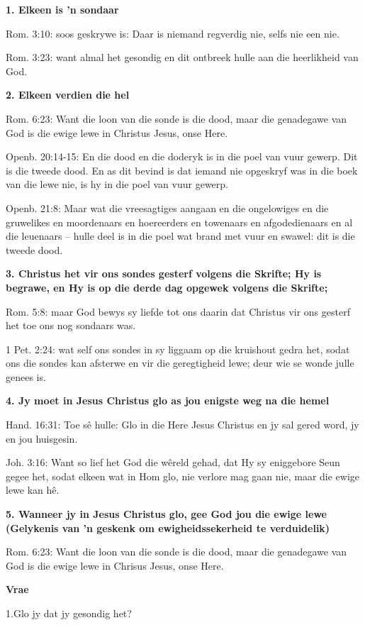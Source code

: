 \textbf{1. Elkeen is 'n sondaar}

Rom. 3:10: soos geskrywe is: Daar is niemand regverdig nie, selfs nie een nie.

Rom. 3:23: want almal het gesondig en dit ontbreek hulle aan die heerlikheid van God.

\textbf{2. Elkeen verdien die hel}

Rom. 6:23: Want die loon van die sonde is die dood, maar die genadegawe van God is die ewige lewe in Christus Jesus, onse Here.

Openb. 20:14-15: En die dood en die doderyk is in die poel van vuur gewerp. Dit is die tweede dood.  En as dit bevind is dat iemand nie opgeskryf was in die boek van die lewe nie, is hy in die poel van vuur gewerp.

Openb. 21:8: Maar wat die vreesagtiges aangaan en die ongelowiges en die gruwelikes en moordenaars en hoereerders en towenaars en afgodedienaars en al die leuenaars – hulle deel is in die poel wat brand met vuur en swawel: dit is die tweede dood.
       
\textbf{3. Christus het vir ons sondes gesterf volgens die Skrifte; Hy is begrawe, en Hy is op die derde dag opgewek volgens die Skrifte;}

Rom. 5:8: maar God bewys sy liefde tot ons daarin dat Christus vir ons gesterf het toe ons nog sondaars was.

1 Pet. 2:24: wat self ons sondes in sy liggaam op die kruishout gedra het, sodat ons die sondes kan afsterwe en vir die geregtigheid lewe; deur wie se wonde julle genees is.

\textbf{4. Jy moet in Jesus Christus glo as jou enigste weg na die hemel}

Hand. 16:31: Toe sê hulle: Glo in die Here Jesus Christus en jy sal gered word, jy en jou huisgesin.

Joh. 3:16: Want so lief het God die wêreld gehad, dat Hy sy eniggebore Seun gegee het, sodat elkeen wat in Hom glo, nie verlore mag gaan nie, maar die ewige lewe kan hê.

\textbf{5. Wanneer jy in Jesus Christus glo, gee God jou die ewige lewe (Gelykenis van 'n geskenk om ewigheids­sekerheid te verduidelik)}

Rom. 6:23: Want die loon van die sonde is die dood, maar die genadegawe van God is die ewige lewe in Chrisus Jesus, onse Here.

\textbf{Vrae}

  1.\hspace{0.6em}Glo jy dat jy gesondig het?


